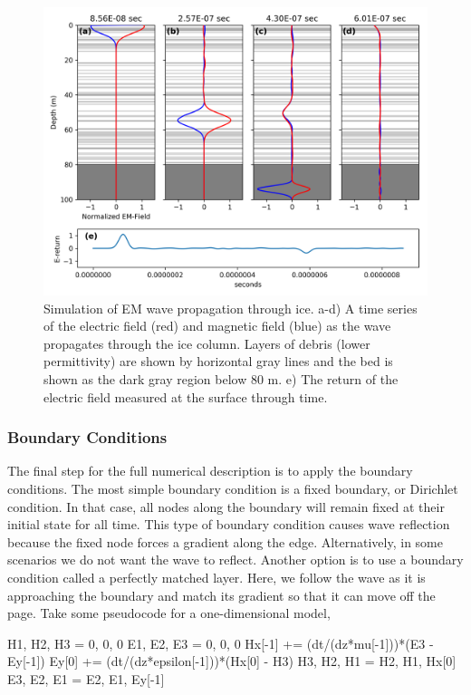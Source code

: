 \documentclass[a4paper]{article}
\begin{document}
\begin{figure}
    \centering
    \includegraphics[width=\textwidth]{./Figures/IceSimulation.png}
    \caption{Simulation of EM wave propagation through ice. a-d) A time series of the electric field (red) and magnetic field (blue) as the wave propagates through the ice column. Layers of debris (lower permittivity) are shown by horizontal gray lines and the bed is shown as the dark gray region below 80 m. e) The return of the electric field measured at the surface through time.}
    \label{fig:Ice}
\end{figure}

\subsubsection{Boundary Conditions}

The final step for the full numerical description is to apply the boundary conditions. The most simple boundary condition is a fixed boundary, or Dirichlet condition. In that case, all nodes along the boundary will remain fixed at their initial state for all time. This type of boundary condition causes wave reflection because the fixed node forces a gradient along the edge. Alternatively, in some scenarios we do not want the wave to reflect. Another option is to use a boundary condition called a perfectly matched layer. Here, we follow the wave as it is approaching the boundary and match its gradient so that it can move off the page. Take some pseudocode for a one-dimensional model, 

\begin{center}
    \colorbox[RGB]{239,240,241}{
    \begin{minipage}{.8\linewidth}
        \begin{algorithmic}[H]
            \State H1, H2, H3 = 0, 0, 0
            \State E1, E2, E3 = 0, 0, 0
            \State
            \State Hx[-1] += (dt/(dz*mu[-1]))*(E3 - Ey[-1]) 
            \State Ey[0] += (dt/(dz*epsilon[-1]))*(Hx[0] - H3) 
            \State
            \State H3, H2, H1 = H2, H1, Hx[0]
            \State E3, E2, E1 = E2, E1, Ey[-1]
            \EndFor
        \end{algorithmic}
    \end{minipage}}
\end{center}
\end{document}
